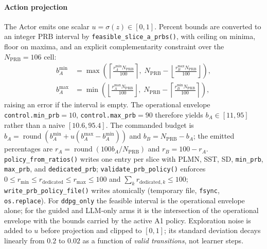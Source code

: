 \paragraph*{Action projection}
The Actor emits one scalar $u=\sigma(z)\in[0,1]$. Percent bounds are converted to an integer PRB interval by \texttt{feasible\_slice\_a\_prbs()}, with ceiling on minima, floor on maxima, and an explicit complementarity constraint over the $N_{\mathrm{PRB}}=106$ cell:
\begin{align}
b_A^{\min}&=\max\!\left(\left\lceil\tfrac{r_A^{\min}N_{\mathrm{PRB}}}{100}\right\rceil,\;N_{\mathrm{PRB}}-\left\lfloor\tfrac{r_B^{\max}N_{\mathrm{PRB}}}{100}\right\rfloor\right),\\
b_A^{\max}&=\min\!\left(\left\lfloor\tfrac{r_A^{\max}N_{\mathrm{PRB}}}{100}\right\rfloor,\;N_{\mathrm{PRB}}-\left\lceil\tfrac{r_B^{\min}N_{\mathrm{PRB}}}{100}\right\rceil\right),
\end{align}
raising an error if the interval is empty. The operational envelope \texttt{control.min\_prb}${}=10$, \texttt{control.max\_prb}${}=90$ therefore yields $b_A\in[11,95]$ rather than a naive $[10.6,95.4]$. The commanded budget is $b_A=\operatorname{round}(b_A^{\min}+u(b_A^{\max}-b_A^{\min}))$ and $b_B=N_{\mathrm{PRB}}-b_A$; the emitted percentages are $r_A=\operatorname{round}(100b_A/N_{\mathrm{PRB}})$ and $r_B=100-r_A$. \texttt{policy\_from\_ratios()} writes one entry per slice with PLMN, SST, SD, \texttt{min\_prb}, \texttt{max\_prb}, and \texttt{dedicated\_prb}; \texttt{validate\_prb\_policy()} enforces $0\leq r_{\min}\leq r_{\mathrm{dedicated}}\leq r_{\max}\leq100$ and $\sum_k r_{\mathrm{dedicated},k}\leq100$; \texttt{write\_prb\_policy\_file()} writes atomically (temporary file, \texttt{fsync}, \texttt{os.replace}). For \texttt{ddpg\_only} the feasible interval is the operational envelope alone; for the guided and LLM-only arms it is the intersection of the operational envelope with the bounds carried by the active A1 policy. Exploration noise is added to $u$ before projection and clipped to $[0,1]$; its standard deviation decays linearly from $0.2$ to $0.02$ as a function of \emph{valid transitions}, not learner steps.

